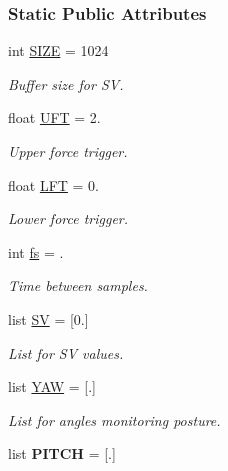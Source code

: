 \subsubsection*{Static Public Attributes}
\begin{DoxyCompactItemize}
\item 
int \hyperlink{classfall_detection_1_1_fall_detection_aa99e61fc17e5b0a0e42c148be47ffdd5}{S\-I\-Z\-E} = 1024
\begin{DoxyCompactList}\small\item\em Buffer size for S\-V. \end{DoxyCompactList}\item 
float \hyperlink{classfall_detection_1_1_fall_detection_a34f4c16af8de8c4efaf6779c46ef5f48}{U\-F\-T} = 2.
\begin{DoxyCompactList}\small\item\em Upper force trigger. \end{DoxyCompactList}\item 
float \hyperlink{classfall_detection_1_1_fall_detection_a32fb8ad5bc5820480e2eb450c679eeda}{L\-F\-T} = 0.
\begin{DoxyCompactList}\small\item\em Lower force trigger. \end{DoxyCompactList}\item 
int \hyperlink{classfall_detection_1_1_fall_detection_aedf3abe0136fa5efe23df8f35228d4a6}{fs} = .
\begin{DoxyCompactList}\small\item\em Time between samples. \end{DoxyCompactList}\item 
list \hyperlink{classfall_detection_1_1_fall_detection_a343631714c9cc3129eaa46abe5c5db82}{S\-V} = \mbox{[}0.\mbox{]}
\begin{DoxyCompactList}\small\item\em List for S\-V values. \end{DoxyCompactList}\item 
\hypertarget{classfall_detection_1_1_fall_detection_addb95520ce608393fd378aed70293199}{list \hyperlink{classfall_detection_1_1_fall_detection_addb95520ce608393fd378aed70293199}{Y\-A\-W} = \mbox{[}.\mbox{]}}\label{classfall_detection_1_1_fall_detection_addb95520ce608393fd378aed70293199}

\begin{DoxyCompactList}\small\item\em List for angles monitoring posture. \end{DoxyCompactList}\item 
\hypertarget{classfall_detection_1_1_fall_detection_aa9fba49d5c83db3cc9032ede9c7d3ff8}{list {\bfseries P\-I\-T\-C\-H} = \mbox{[}.\mbox{]}}\label{classfall_detection_1_1_fall_detection_aa9fba49d5c83db3cc9032ede9c7d3ff8}


\end{DoxyCompactItemize}
